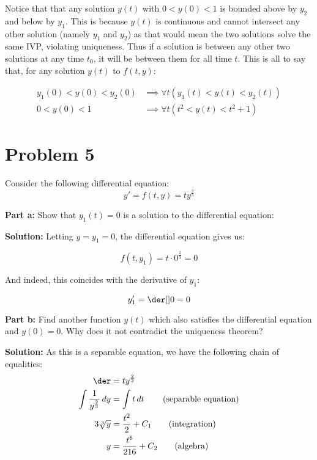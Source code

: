 \documentclass{article}
\begin{document}
Notice that that any solution $y(t)$ with $0<y(0)<1$ is bounded above by $y_2$ and below by $y_1$. This is because $y(t)$ is continuous and cannot intersect any other solution (namely $y_1$ and $y_2$) as that would mean the two solutions solve the same IVP, violating uniqueness. Thus if a solution is between any other two solutions at any time $t_0$, it will be between them for all time $t$. This is all to say that, for any solution $y(t)$ to $f(t,y)$:

\begin{align*}
    y_1(0)<y(0)<y_2(0)&\implies \forall t(y_1(t)<y(t)<y_2(t))\\
    0<y(0)<1&\implies \forall t(t^2<y(t)<t^2+1)
\end{align*}

\section*{Problem 5}
Consider the following differential equation:
\begin{equation*}
    y'=f(t,y)=ty^{\frac{2}{3}}
\end{equation*}

\noindent\textbf{Part a:} Show that $y_1(t)=0$ is a solution to the differential equation:
\bigskip

\noindent\textbf{Solution:} Letting $y=y_1=0$, the differential equation gives us:

\begin{equation*}
    f(t,y_1)=t\cdot0^{\frac{2}{3}}=0
\end{equation*}

And indeed, this coincides with the derivative of $y_1$:

\begin{equation*}
    y_1'=\der[]0=0
\end{equation*}
\smallskip

\noindent\textbf{Part b:} Find another function $y(t)$ which also satisfies the differential equation and $y(0) = 0$. Why does it not contradict the uniqueness theorem?
\bigskip
\pagebreak

\noindent\textbf{Solution:} As this is a separable equation, we have the following chain of equalities:
\begin{align*}
    \der&=ty^{\frac{2}{3}}\\
    \int \frac{1}{y^{\frac{2}{3}}}\mathop{dy}&=\int t\mathop{dt}\tag{separable equation}\\
    3\sqrt[3]{y}&=\frac{t^2}{2}+C_1\tag{integration}\\
    y&=\frac{t^6}{216}+C_2\tag{algebra}\\
\end{align*}
\end{document}
